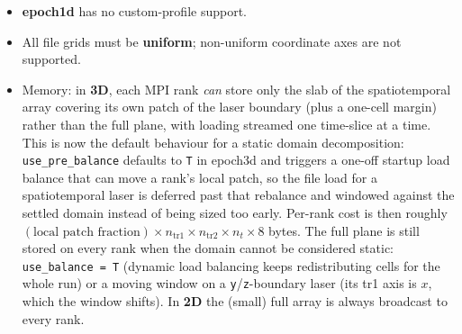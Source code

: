 \documentclass[11pt,a4paper]{article}
\begin{document}
\begin{itemize}
  \item \textbf{epoch1d} has no custom-profile support.
  \item All file grids must be \textbf{uniform}; non-uniform coordinate
    axes are not supported.
  \item Memory: in \textbf{3D}, each MPI rank \emph{can} store only the
    slab of the spatiotemporal array covering its own patch of the laser
    boundary (plus a one-cell margin) rather than the full plane, with
    loading streamed one time-slice at a time. This is now the default
    behaviour for a static domain decomposition: \texttt{use\_pre\_balance}
    defaults to \texttt{T} in epoch3d and triggers a one-off startup load
    balance that can move a rank's local patch, so the file load for a
    spatiotemporal laser is deferred past that rebalance and windowed
    against the settled domain instead of being sized too early.
    Per-rank cost is then roughly $(\text{local patch fraction}) \times
    n_{\mathrm{tr1}} \times n_{\mathrm{tr2}} \times n_t \times 8$ bytes.
    The full plane is still stored on every rank when the domain cannot
    be considered static: \texttt{use\_balance = T} (dynamic load
    balancing keeps redistributing cells for the whole run) or a moving
    window on a \texttt{y}/\texttt{z}-boundary laser (its tr1 axis is
    $x$, which the window shifts). In \textbf{2D} the (small) full array
    is always broadcast to every rank.
\end{itemize}
\end{document}
